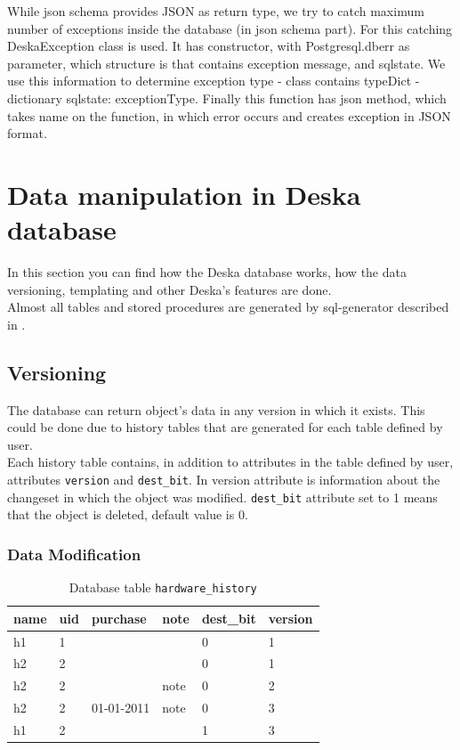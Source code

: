 \documentclass[deska]{subfiles}
\begin{document}
While json schema provides JSON as return type, we try to catch maximum number of exceptions inside the database (in
json schema part).
For this catching DeskaException class is used. It has constructor, with Postgresql.dberr as parameter, which structure is that contains exception
message, and sqlstate. We use this information to determine exception type - class contains typeDict - dictionary {sqlstate: exceptionType}.
Finally this function has json method, which takes name on the function, in which error occurs and creates exception in JSON format.

\label{sec:deska-db}

\section{Data manipulation in Deska database}
\label{sec:deska-db-data-manipulation}
In this section you can find how the Deska database works, how the data versioning, templating and other Deska's features are done.\\
Almost all tables and stored procedures are generated by sql-generator described in .

\subsection{Versioning}
\label{sec:versioning}

The database can return object's data in any version in which it exists. This could be done due to history tables that are generated for each table defined by user.\\
Each history table contains, in addition to attributes in the table defined by user, attributes {\tt version} and {\tt dest\_bit}. In version attribute is information about the changeset in which the object was modified. {\tt dest\_bit} attribute set to 1 means that the object is deleted, default value is 0.\\

\subsubsection{Data Modification}
\label{sec:deska-db-ver-data-modif}

\begin{longtable}{ l | l | l | l | l | l }
    \caption{Database table {\tt hardware\_history}}\\
    name & uid & purchase & note & dest\_bit & version\\
    \hline
    \endhead
\label{tab:example-hardwarehist}
    h1 & 1 & & & 0 & 1 \\
    h2 & 2 & & & 0 & 1 \\
    h2 & 2 & & note & 0 & 2 \\
    h2 & 2 & 01-01-2011 & note & 0 & 3 \\
    h1 & 2 & & & 1 & 3 \\
    \hline
\end{longtable}
\end{document}
